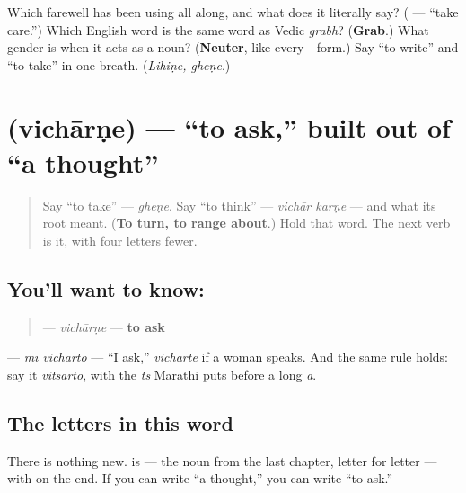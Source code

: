 \begin{tcolorbox}[breakable,colback=teal!4,colframe=teal!35!black,title={Before you move on}]
Which farewell has been using \textbf{} all along, and what does it literally say? (\textbf{ } — \textquotedblleft{}take care.\textquotedblright{}) Which English word is the same word as Vedic \emph{grabh}? (\textbf{Grab}.) What gender is \textbf{} when it acts as a noun? (\textbf{Neuter}, like every \emph{-} form.) Say \textquotedblleft{}to write\textquotedblright{} and \textquotedblleft{}to take\textquotedblright{} in one breath. (\emph{Lihiṇe, gheṇe}.)
\end{tcolorbox}
\section[\texorpdfstring{\mr{विचारणे} (vichārṇe)}{विचारणे (vichārṇe)}]{ (vichārṇe) — \textquotedblleft{}to ask,\textquotedblright{} built out of \textquotedblleft{}a thought\textquotedblright{}}

\label{lesson:MR-C09-vicharne}



\begin{quote}
Say \textquotedblleft{}to take\textquotedblright{} — \emph{gheṇe}. Say \textquotedblleft{}to think\textquotedblright{} — \emph{vichār karṇe} — and what its root meant. (\textbf{To turn, to range about}.) Hold that word. The next verb is it, with four letters fewer.
\end{quote}

\subsection*{You'll want to know: }
\begin{quote}
\textbf{} — \emph{vichārṇe} — \textbf{to ask}
\end{quote}

\textbf{ } — \emph{mī vichārto} — \textquotedblleft{}I ask,\textquotedblright{} \textbf{} \emph{vichārte} if a woman speaks. And the same \textbf{} rule holds: say it \emph{vitsārto}, with the \emph{ts} Marathi puts before a long \emph{ā}.

\subsection*{The letters in this word}
There is nothing new. \textbf{} is \textbf{} — the noun from the last chapter, letter for letter — with \textbf{} on the end. If you can write \textquotedblleft{}a thought,\textquotedblright{} you can write \textquotedblleft{}to ask.\textquotedblright{}

